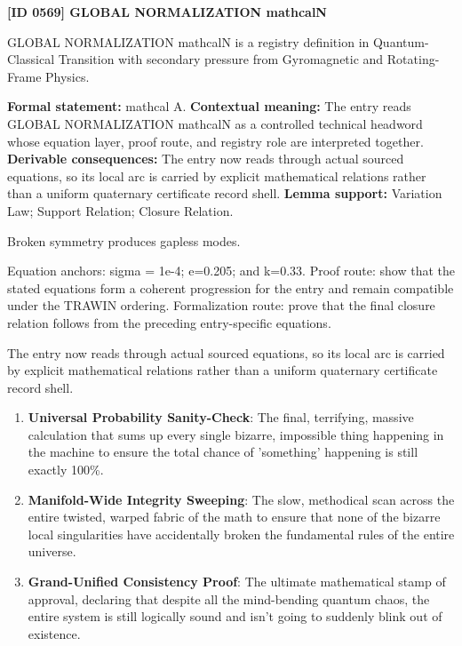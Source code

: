 \clearpage
\noindent\textbf{[ID 0569] GLOBAL NORMALIZATION mathcalN}\par
\vspace{0.35em}
\begingroup\small
{}
GLOBAL NORMALIZATION mathcalN is a registry definition in Quantum-Classical Transition with secondary pressure from Gyromagnetic and Rotating-Frame Physics.

\begingroup\footnotesize\setlength{\emergencystretch}{3em}\sloppy
\textbf{Formal statement:} mathcal A. \textbf{Contextual meaning:} The entry reads GLOBAL NORMALIZATION mathcalN as a controlled technical headword whose equation layer, proof route, and registry role are interpreted together. \textbf{Derivable consequences:} The entry now reads through actual sourced equations, so its local arc is carried by explicit mathematical relations rather than a uniform quaternary certificate record shell. \textbf{Lemma support:} Variation Law; Support Relation; Closure Relation.\par
\endgroup

Broken symmetry produces gapless modes.

Equation anchors: sigma = 1e-4; e=0.205; and k=0.33. Proof route: show that the stated equations form a coherent progression for the entry and remain compatible under the TRAWIN ordering. Formalization route: prove that the final closure relation follows from the preceding entry-specific equations.

The entry now reads through actual sourced equations, so its local arc is carried by explicit mathematical relations rather than a uniform quaternary certificate record shell.
\endgroup

\begin{enumerate}[leftmargin=1.6em,itemsep=6pt,topsep=4pt]
\item \textbf{Universal Probability Sanity-Check}: The final, terrifying, massive calculation that sums up every single bizarre, impossible thing happening in the machine to ensure the total chance of 'something' happening is still exactly 100\%.
\item \textbf{Manifold-Wide Integrity Sweeping}: The slow, methodical scan across the entire twisted, warped fabric of the math to ensure that none of the bizarre local singularities have accidentally broken the fundamental rules of the entire universe.
\item \textbf{Grand-Unified Consistency Proof}: The ultimate mathematical stamp of approval, declaring that despite all the mind-bending quantum chaos, the entire system is still logically sound and isn't going to suddenly blink out of existence.
\end{enumerate}

